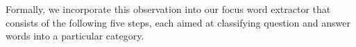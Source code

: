 
Formally, we incorporate this observation into our focus word extractor that consists of the following five steps, %
each aimed at classifying question and answer words into a particular category.   

